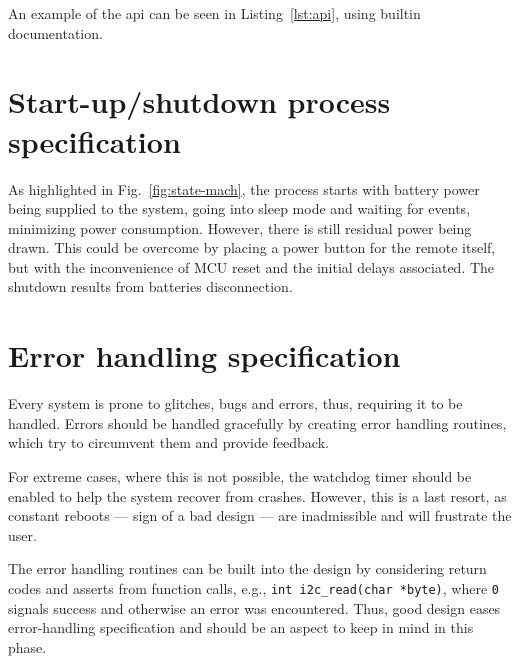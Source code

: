 An example of the \gls{api} can be seen in Listing~\ref{lst:api}, using builtin documentation.
%
%

\section{Start-up/shutdown process specification}
\label{sec:startup-shutdown}
As highlighted in Fig.~\ref{fig:state-mach}, the process starts with battery
power being supplied to the system, going into sleep mode and waiting for
events, minimizing power consumption. However, there is still residual power
being drawn. This could be overcome by placing a power button for the remote
itself, but with the inconvenience of MCU reset and the initial delays
associated. The shutdown results from batteries disconnection.
%
  \vspace{-5mm}
%  
\section{Error handling specification}
\label{sec:error-handling-specification}
Every system is prone to glitches, bugs and errors, thus, requiring it to be
handled. Errors should be handled gracefully by creating error handling
routines, which try to circumvent them and provide feedback.

For extreme cases, where this is not possible, the watchdog timer should be
enabled to help the system recover from crashes. However, this is a last resort,
as constant reboots --- sign of a bad design --- are inadmissible and will
frustrate the user.

The error handling routines can be built into the design by considering return
codes and asserts from function calls, e.g., \texttt{int i2c\_read(char *byte)},
where \texttt{0} signals success and otherwise an error was encountered. Thus,
good design eases error-handling specification and should be an aspect to keep
in mind in this phase.
%
  \vspace{-5mm}
